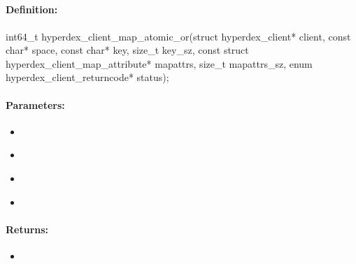 \pagebreak
\subsection{}
\label{api:c:map_atomic_or}


\paragraph{Definition:}
\begin{ccode}
int64_t hyperdex_client_map_atomic_or(struct hyperdex_client* client,
        const char* space,
        const char* key, size_t key_sz,
        const struct hyperdex_client_map_attribute* mapattrs, size_t mapattrs_sz,
        enum hyperdex_client_returncode* status);
\end{ccode}

\paragraph{Parameters:}
\begin{itemize}[noitemsep]
\item {}\\

\item {}\\

\item {}\\

\item {}\\

\end{itemize}

\paragraph{Returns:}
\begin{itemize}[noitemsep]
\item {}\\

\end{itemize}

